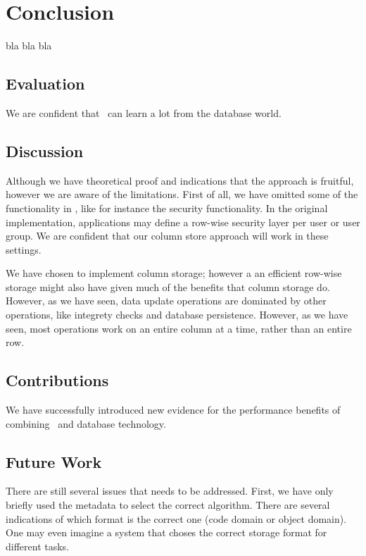 \chapter{Conclusion}
\label{chap:Conclusion}
bla bla bla

\section{Evaluation}
\label{sec:Evaluation}
We are confident that \mdd~can learn a lot from the database world.

\section{Discussion}
\label{sec:Discussion}
Although we have theoretical proof and indications that the approach is fruitful, however we are aware of the limitations. First of all, we have omitted some of the functionality in \gaf, like for instance the security functionality. In the original implementation, applications may define a row-wise security layer per user or user group. We are confident that our column store approach will work in these settings.

We have chosen to implement column storage; however a an efficient row-wise storage might also have given much of the benefits that column storage do. However, as we have seen, data update operations are dominated by other operations, like integrety checks and database persistence. However, as we have seen, most operations work on an entire column at a time, rather than an entire row. 

\section{Contributions}
\label{sec:Contributions}
We have successfully introduced new evidence for the performance benefits of combining \mdd~and database technology.

\section{Future Work}
\label{sec:Future Work}
There are still several issues that needs to be addressed. First, we have only briefly used the metadata to select the correct algorithm. There are several indications of which format is the correct one (code domain or object domain). One may even imagine a system that choses the correct storage format for different tasks.

